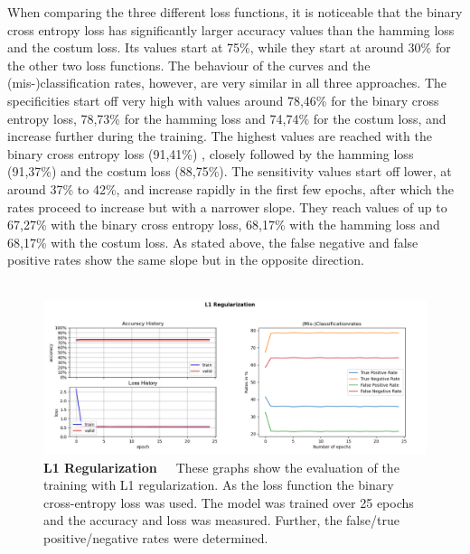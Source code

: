 When comparing the three different loss functions, it is noticeable that the binary cross entropy loss has significantly larger accuracy values than the hamming loss and the costum loss. Its values start at 75\%, while they start at around 30\% for the other two loss functions. The behaviour of the curves and the (mis-)classification rates, however, are very similar in all three approaches. The specificities start off very high with values around 78,46\% for the binary cross entropy loss, 78,73\% for the hamming loss and 74,74\% for the costum loss, and increase further during the training. The highest values are reached with the binary cross entropy loss (91,41\%) , closely followed by the hamming loss (91,37\%) and the costum loss (88,75\%). The sensitivity values start off lower, at around 37\% to 42\%, and increase rapidly in the first few epochs, after which the rates proceed to increase but with a narrower slope. They reach values of up to 67,27\% with the binary cross entropy loss, 68,17\% with the hamming loss and 68,17\% with the costum loss. As stated above, the false negative and false positive rates show the same slope but in the opposite direction. \\
\\
\begin{figure}[h]
	\centering
	\includegraphics[scale=0.37]{Figures/chapter04/multilabel_L1.png}
	\decoRule
	\caption[L1 Regularization]{\textbf{L1 Regularization}~~~These graphs show the evaluation of the training with L1 regularization. As the loss function the binary cross-entropy loss was used. The model was trained over 25 epochs and the accuracy and loss was measured. Further, the false/true positive/negative rates were determined.}
	\label{fig:MultilabelL1Regularization}
\end{figure}
\\
